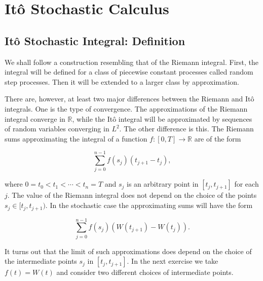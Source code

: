 
\chapter{Itô Stochastic Calculus}
\label{chap:stochastic-calculus}

\section{Itô Stochastic Integral: Definition}
\label{sec:ItoIntegralDefinition}

We shall follow a construction resembling that of the Riemann integral. First, the integral will be defined for a class of piecewise constant processes called random step processes. Then it will be extended to a larger class by approximation.

There are, however, at least two major differences between the Riemann and Itô integrals. One is the type of convergence. The approximations of the Riemann integral converge in $\mathbb{R}$, while the Itô integral will be approximated by sequences of random variables converging in $L^2$. The other difference is this. The Riemann sums approximating the integral of a function $f:[0,T]\to\mathbb{R}$ are of the form

\begin{equation}
\sum_{j=0}^{n-1} f(s_j)(t_{j+1} - t_j),
\label{eq:RiemannSum}
\end{equation}

where $0 = t_0 < t_1 < \cdots < t_n = T$ and $s_j$ is an arbitrary point in $[t_j, t_{j+1}]$ for each $j$. The value of the Riemann integral does not depend on the choice of the points $s_j \in [t_j, t_{j+1})$. In the stochastic case the approximating sums will have the form

\begin{equation}
\sum_{j=0}^{n-1} f(s_j)(W(t_{j+1}) - W(t_j)).
\label{eq:ItoApproxSum}
\end{equation}

It turns out that the limit of such approximations does depend on the choice of the intermediate points $s_j$ in $[t_j, t_{j+1}]$. In the next exercise we take $f(t) = W(t)$ and consider two different choices of intermediate points.

